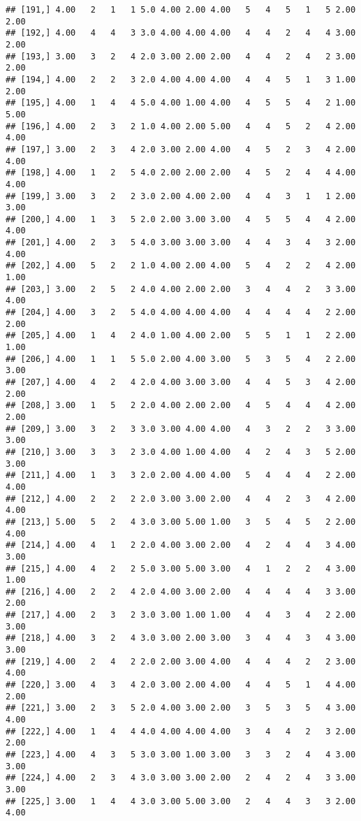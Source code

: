 \documentclass[]{article}
\begin{document}
\begin{verbatim}
## [191,] 4.00   2   1   1 5.0 4.00 2.00 4.00   5   4   5   1   5 2.00 2.00
## [192,] 4.00   4   4   3 3.0 4.00 4.00 4.00   4   4   2   4   4 3.00 2.00
## [193,] 3.00   3   2   4 2.0 3.00 2.00 2.00   4   4   2   4   2 3.00 2.00
## [194,] 4.00   2   2   3 2.0 4.00 4.00 4.00   4   4   5   1   3 1.00 2.00
## [195,] 4.00   1   4   4 5.0 4.00 1.00 4.00   4   5   5   4   2 1.00 5.00
## [196,] 4.00   2   3   2 1.0 4.00 2.00 5.00   4   4   5   2   4 2.00 4.00
## [197,] 3.00   2   3   4 2.0 3.00 2.00 4.00   4   5   2   3   4 2.00 4.00
## [198,] 4.00   1   2   5 4.0 2.00 2.00 2.00   4   5   2   4   4 4.00 4.00
## [199,] 3.00   3   2   2 3.0 2.00 4.00 2.00   4   4   3   1   1 2.00 3.00
## [200,] 4.00   1   3   5 2.0 2.00 3.00 3.00   4   5   5   4   4 2.00 4.00
## [201,] 4.00   2   3   5 4.0 3.00 3.00 3.00   4   4   3   4   3 2.00 4.00
## [202,] 4.00   5   2   2 1.0 4.00 2.00 4.00   5   4   2   2   4 2.00 1.00
## [203,] 3.00   2   5   2 4.0 4.00 2.00 2.00   3   4   4   2   3 3.00 4.00
## [204,] 4.00   3   2   5 4.0 4.00 4.00 4.00   4   4   4   4   2 2.00 2.00
## [205,] 4.00   1   4   2 4.0 1.00 4.00 2.00   5   5   1   1   2 2.00 1.00
## [206,] 4.00   1   1   5 5.0 2.00 4.00 3.00   5   3   5   4   2 2.00 3.00
## [207,] 4.00   4   2   4 2.0 4.00 3.00 3.00   4   4   5   3   4 2.00 2.00
## [208,] 3.00   1   5   2 2.0 4.00 2.00 2.00   4   5   4   4   4 2.00 2.00
## [209,] 3.00   3   2   3 3.0 3.00 4.00 4.00   4   3   2   2   3 3.00 3.00
## [210,] 3.00   3   3   2 3.0 4.00 1.00 4.00   4   2   4   3   5 2.00 3.00
## [211,] 4.00   1   3   3 2.0 2.00 4.00 4.00   5   4   4   4   2 2.00 4.00
## [212,] 4.00   2   2   2 2.0 3.00 3.00 2.00   4   4   2   3   4 2.00 4.00
## [213,] 5.00   5   2   4 3.0 3.00 5.00 1.00   3   5   4   5   2 2.00 4.00
## [214,] 4.00   4   1   2 2.0 4.00 3.00 2.00   4   2   4   4   3 4.00 3.00
## [215,] 4.00   4   2   2 5.0 3.00 5.00 3.00   4   1   2   2   4 3.00 1.00
## [216,] 4.00   2   2   4 2.0 4.00 3.00 2.00   4   4   4   4   3 3.00 2.00
## [217,] 4.00   2   3   2 3.0 3.00 1.00 1.00   4   4   3   4   2 2.00 3.00
## [218,] 4.00   3   2   4 3.0 3.00 2.00 3.00   3   4   4   3   4 3.00 3.00
## [219,] 4.00   2   4   2 2.0 2.00 3.00 4.00   4   4   4   2   2 3.00 4.00
## [220,] 3.00   4   3   4 2.0 3.00 2.00 4.00   4   4   5   1   4 4.00 2.00
## [221,] 3.00   2   3   5 2.0 4.00 3.00 2.00   3   5   3   5   4 3.00 4.00
## [222,] 4.00   1   4   4 4.0 4.00 4.00 4.00   3   4   4   2   3 2.00 2.00
## [223,] 4.00   4   3   5 3.0 3.00 1.00 3.00   3   3   2   4   4 3.00 3.00
## [224,] 4.00   2   3   4 3.0 3.00 3.00 2.00   2   4   2   4   3 3.00 3.00
## [225,] 3.00   1   4   4 3.0 3.00 5.00 3.00   2   4   4   3   3 2.00 4.00

\end{verbatim}
\end{document}
